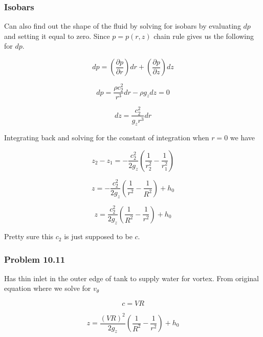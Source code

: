 \subsubsection{Isobars}

Can also find out the shape of the fluid by solving for isobars by evaluating $dp$ and setting it equal to zero.
Since $p=p(r,z)$ chain rule gives us the following for $dp$.

\begin{equation*}
  dp=\left(\frac{\partial{}p}{\partial{}r}\right)dr+\left(\frac{\partial{}p}{\partial{}z}\right)dz
\end{equation*}

\begin{equation*}
  dp=\frac{\rho{}c_{2}^{2}}{r^{3}}dr-\rho{}g_{z}dz=0
\end{equation*}

\begin{equation*}
  dz=\frac{c_{2}^{2}}{g_{z}r^{3}}dr
\end{equation*}

Integrating back and solving for the constant of integration when $r=0$ we have

\begin{equation*}
  z_{2}-z_{1}=-\frac{c_{2}^{2}}{2g_{z}}\left(\frac{1}{r_{2}^{2}}-\frac{1}{r_{1}^{2}}\right)
\end{equation*}

\begin{equation*}
  z=-\frac{c_{2}^{2}}{2g_{z}}\left(\frac{1}{r^{2}}-\frac{1}{R^{2}}\right)+h_{0}
\end{equation*}

\begin{equation*}
  z=\frac{c_{2}^{2}}{2g_{z}}\left(\frac{1}{R^{2}}-\frac{1}{r^{2}}\right)+h_{0}
\end{equation*}

Pretty sure this $c_{2}$ is just supposed to be $c$.

\subsubsection{Problem 10.11}

Has thin inlet in the outer edge of tank to supply water for vortex.
From original equation where we solve for $v_{\theta}$

\begin{equation*}
  c=VR
\end{equation*}

\begin{equation*}
  z=\frac{(VR)^{2}}{2g_{z}}\left(\frac{1}{R^{2}}-\frac{1}{r^{2}}\right)+h_{0}
\end{equation*}

